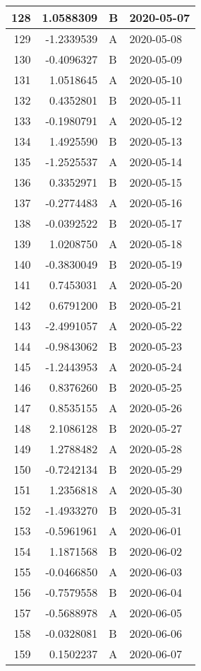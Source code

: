 \begin{tabular}{r|r|l|l}
\hline
128 & 1.0588309 & B & 2020-05-07\\
\hline
129 & -1.2339539 & A & 2020-05-08\\
\hline
130 & -0.4096327 & B & 2020-05-09\\
\hline
131 & 1.0518645 & A & 2020-05-10\\
\hline
132 & 0.4352801 & B & 2020-05-11\\
\hline
133 & -0.1980791 & A & 2020-05-12\\
\hline
134 & 1.4925590 & B & 2020-05-13\\
\hline
135 & -1.2525537 & A & 2020-05-14\\
\hline
136 & 0.3352971 & B & 2020-05-15\\
\hline
137 & -0.2774483 & A & 2020-05-16\\
\hline
138 & -0.0392522 & B & 2020-05-17\\
\hline
139 & 1.0208750 & A & 2020-05-18\\
\hline
140 & -0.3830049 & B & 2020-05-19\\
\hline
141 & 0.7453031 & A & 2020-05-20\\
\hline
142 & 0.6791200 & B & 2020-05-21\\
\hline
143 & -2.4991057 & A & 2020-05-22\\
\hline
144 & -0.9843062 & B & 2020-05-23\\
\hline
145 & -1.2443953 & A & 2020-05-24\\
\hline
146 & 0.8376260 & B & 2020-05-25\\
\hline
147 & 0.8535155 & A & 2020-05-26\\
\hline
148 & 2.1086128 & B & 2020-05-27\\
\hline
149 & 1.2788482 & A & 2020-05-28\\
\hline
150 & -0.7242134 & B & 2020-05-29\\
\hline
151 & 1.2356818 & A & 2020-05-30\\
\hline
152 & -1.4933270 & B & 2020-05-31\\
\hline
153 & -0.5961961 & A & 2020-06-01\\
\hline
154 & 1.1871568 & B & 2020-06-02\\
\hline
155 & -0.0466850 & A & 2020-06-03\\
\hline
156 & -0.7579558 & B & 2020-06-04\\
\hline
157 & -0.5688978 & A & 2020-06-05\\
\hline
158 & -0.0328081 & B & 2020-06-06\\
\hline
159 & 0.1502237 & A & 2020-06-07\\

\end{tabular}

